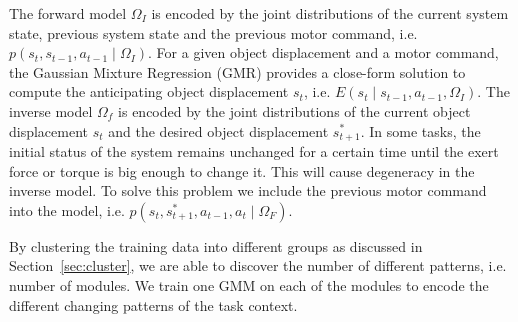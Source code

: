 The forward model $\Omega_I$ is encoded by the joint distributions of the current system state, previous system state and the previous motor command, i.e. $p(s_t,s_{t-1},a_{t-1}\mid{\Omega_I})$. For a given object displacement and a motor command, the Gaussian Mixture Regression (GMR) provides a close-form solution to compute the anticipating object displacement $s_t$, i.e. $E(s_t{\mid}s_{t-1},a_{t-1},{\Omega_I})$. The inverse model $\Omega_f$ is encoded by the joint distributions of the current object displacement $s_t$ and the desired object displacement $s^{*}_{t+1}$. In some tasks, the initial status of the system remains unchanged for a certain time until the exert force or torque is big enough to change it. This will cause degeneracy in the inverse model. To solve this problem we include the previous motor command into the model, i.e. $p(s_t,s^{*}_{t+1},a_{t-1},a_t{\mid}{\Omega_F})$.



By clustering the training data into different groups as discussed in Section~\ref{sec:cluster}, we are able to discover the number of different patterns, i.e. number of modules. We train one GMM on each of the modules to encode the different changing patterns of the task context.







